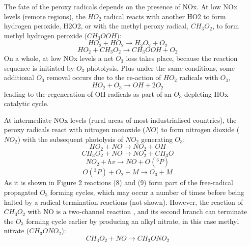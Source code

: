 \documentclass[11pt,a4paper]{article}
\begin{document}
The fate of the peroxy radicals depends on the presence of NOx. At low NOx levels (remote regions), the $HO_2$ radical reacts with another HO2 to form hydrogen peroxide, H2O2, or with the methyl peroxy radical, $CH_3O_2$, to form methyl hydrogen peroxide ($CH_3OOH$):
\begin{equation} \label{eq:HO2+HO2}
HO_2 + HO_2 \rightarrow H_2O_2 + O_2
\end{equation}
\begin{equation} \label{eq:HO2+CH3O2}
HO_2 + CH_3O_2 \rightarrow CH_3OOH + O_2
\end{equation}
On a whole, at low NOx levels a net $O_3$ loss takes place, because the reaction sequence is initiated by $O_3$ photolysis. Plus under the same conditions, some additional $O_3$ removal occurs due to the re-action of $HO_2$ radicals with $O_3$,
\begin{equation} \label{eq:HO2+O3}
HO_2 + O_3 \rightarrow OH + 2O_2
\end{equation}
leading to the regeneration of OH radicals as part of an $O_3$ depleting HOx catalytic cycle.

At intermediate NOx levels (rural areas of most industrialised countries), the peroxy radicals react with nitrogen monoxide ($NO$) to form nitrogen dioxide ($NO_2$) with the subsequent photolysis of $NO_2$ generating $O_3$:
\begin{equation} \label{eq:HO2+NO}
HO_2 + NO \rightarrow NO_2 + OH
\end{equation}
\begin{equation} \label{eq:CH_3O_2+NO}
CH_3O_2 + NO \rightarrow NO_2 + CH_3O
\end{equation}
\begin{equation} \label{eq:NO2hv}
NO_2 + hv \rightarrow NO + O(^3P)
\end{equation}
\begin{equation} \label{eq:O3P+O2}
O(^3P) + O_2 + M \rightarrow O_3 + M
\end{equation}
As it is shown in Figure 2 reactions (8) and (9) form part of the free-radical propagated $O_3$ forming cycles, which may occur a number of times before being halted by a radical termination reactions (not shown). However, the reaction of $CH_3O_2$ with NO is a two-channel reaction \citep{Day2003}, and its second branch can terminate the $O_3$ forming cycle earlier by producing an alkyl nitrate, in this case methyl nitrate ($CH_3ONO_2$):
\begin{equation} \label{eq:CH3NO3form}
CH_3O_2 + NO \rightarrow CH_3ONO_2
\end{equation}
\end{document}

